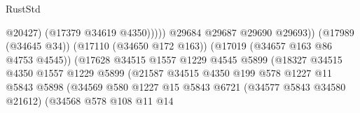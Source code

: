 \begin{lexlean}{RustStd}
\begin{coremodule}
                                                              @20427)
                                                            (@17379 @34619 @4350)))))
                                                    @29684
                                                    @29687
                                                    @29690
                                                    @29693))
                                                (@17989 (@34645 @34))
                                                (@17110 (@34650 @172 @163))
                                                (@17019 (@34657 @163 @86 @4753 @4545))
                                                (@17628
                                                  @34515
                                                  @1557
                                                  @1229
                                                  @4545
                                                  @5899
                                                  (@18327
                                                    @34515
                                                    @4350
                                                    @1557
                                                    @1229
                                                    @5899
                                                    (@21587
                                                      @34515
                                                      @4350
                                                      @199
                                                      @578
                                                      @1227
                                                      @11
                                                      @5843
                                                      @5898
                                                      (@34569
                                                        @580
                                                        @1227
                                                        @15
                                                        @5843
                                                        @6721
                                                        (@34577 @5843 @34580 @21612)
                                                        (@34568
                                                          @578
                                                          @108
                                                          @11
                                                          @14

\end{coremodule}
\end{lexlean}
